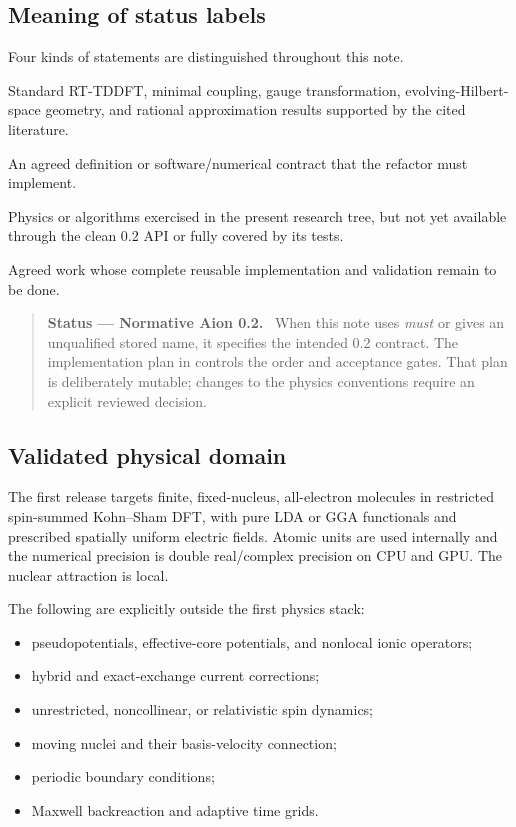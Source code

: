 \documentclass[11pt]{article}
\newenvironment{statusbox}[1]
  {\begin{quote}\small\textbf{Status --- #1.}\ }
  {\end{quote}}
\begin{document}
\subsection{Meaning of status labels}

Four kinds of statements are distinguished throughout this note.

\begin{description}[leftmargin=34mm,style=nextline]
\item[Established theory]
Standard RT-TDDFT, minimal coupling, gauge transformation, evolving-Hilbert-
space geometry, and rational approximation results supported by the cited
literature.
\item[Normative Aion 0.2]
An agreed definition or software/numerical contract that the refactor must
implement.
\item[Draft-validated]
Physics or algorithms exercised in the present research tree, but not yet
available through the clean 0.2 API or fully covered by its tests.
\item[Planned/unvalidated]
Agreed work whose complete reusable implementation and validation remain to
be done.
\end{description}

\begin{statusbox}{Normative Aion 0.2}
When this note uses \emph{must} or gives an unqualified stored name, it
specifies the intended 0.2 contract. The implementation plan in
 controls the order and acceptance
gates. That plan is deliberately mutable; changes to the physics conventions
require an explicit reviewed decision.
\end{statusbox}

\subsection{Validated physical domain}

The first release targets finite, fixed-nucleus, all-electron molecules in
restricted spin-summed Kohn--Sham DFT, with pure LDA or GGA functionals and
prescribed spatially uniform electric fields. Atomic units are used internally
and the numerical precision is double real/complex precision on CPU and GPU.
The nuclear attraction is local.

The following are explicitly outside the first physics stack:

\begin{itemize}
\item pseudopotentials, effective-core potentials, and nonlocal ionic
  operators;
\item hybrid and exact-exchange current corrections;
\item unrestricted, noncollinear, or relativistic spin dynamics;
\item moving nuclei and their basis-velocity connection;
\item periodic boundary conditions;
\item Maxwell backreaction and adaptive time grids.
\end{itemize}
\end{document}
